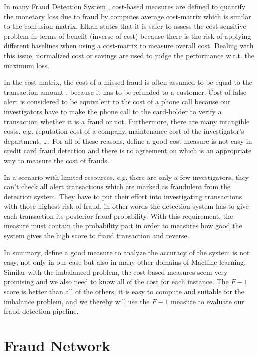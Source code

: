 In many Fraud Detection System \citep{sahin2013cost, mahmoudi2015detecting, bahnsen2015example}, cost-based measures are defined to quantify the monetary loss due to fraud \citep{bahnsen2013cost} by computes average cost-matrix which is similar to the confusion matrix. Elkan \citep{elkan2001foundations} states that it is safer to assess the cost-sensitive problem in terms of benefit (inverse of cost) because there is the risk of applying different baselines when using a cost-matrix to measure overall cost. Dealing with this issue, normalized cost or savings \citep{bahnsen2015example} are used to judge the performance w.r.t. the maximum loss.

In the cost matrix, the cost of a missed fraud is often assumed to be equal to the transaction amount \citep{elkan2001foundations, bahnsen2013cost}, because it has to be refunded to a customer. Cost of false alert is considered to be equivalent to the cost of a phone call because our investigators have to make the phone call to the card-holder to verify a transaction whether it is a fraud or not. Furthermore, there are many intangible costs, e.g. reputation cost of a company, maintenance cost of the investigator's department, \dots. For all of these reasons, define a good cost measure is not easy in credit card fraud detection and there is no agreement on which is an appropriate way to measure the cost of frauds.

In a scenario with limited resources, e.g. there are only a few investigators, they can't check all alert transactions which are marked as fraudulent from the detection system. They have to put their effort into investigating transactions with those highest risk of fraud, in other words the detection system has to give each transaction its posterior fraud probability. With this requirement, the measure must contain the probability part in order to measures how good the system gives the high score to fraud transaction and reverse.

In summary, define a good measure to analyze the accuracy of the system is not easy, not only in our case but also in many other domains of Machine learning. Similar with the imbalanced problem, the cost-based measures seem very promising and we also need to know all of the cost for each instance. The $F-1$ score is better than all of the others, it is easy to compute and suitable for the imbalance problem, and we thereby will use the $F-1$ measure to evaluate our fraud detection pipeline.


\section{Fraud Network}
\label{fraud_network}

